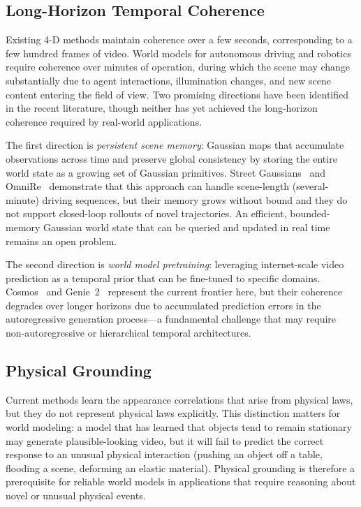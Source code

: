 \subsection{Long-Horizon Temporal Coherence}

Existing 4-D methods maintain coherence over a few seconds, corresponding
to a few hundred frames of video.
World models for autonomous driving and robotics require coherence over minutes
of operation, during which the scene may change substantially due to agent
interactions, illumination changes, and new scene content entering the field of view.
Two promising directions have been identified in the recent literature,
though neither has yet achieved the long-horizon coherence required by
real-world applications.

The first direction is \emph{persistent scene memory}: Gaussian maps that
accumulate observations across time and preserve global consistency by storing
the entire world state as a growing set of Gaussian primitives.
Street Gaussians~\citep{yan2024streetgaussian} and OmniRe~\citep{chen2024omnire}
demonstrate that this approach can handle scene-length (several-minute) driving
sequences, but their memory grows without bound and they do not support
closed-loop rollouts of novel trajectories.
An efficient, bounded-memory Gaussian world state that can be queried and
updated in real time remains an open problem.

The second direction is \emph{world model pretraining}: leveraging internet-scale
video prediction as a temporal prior that can be fine-tuned to specific domains.
Cosmos~\citep{agarwal2025cosmos} and Genie~2~\citep{parkerholder2024genie2}
represent the current frontier here, but their coherence degrades over longer
horizons due to accumulated prediction errors in the autoregressive generation
process---a fundamental challenge that may require non-autoregressive or
hierarchical temporal architectures.

\subsection{Physical Grounding}

Current methods learn the appearance correlations that arise from physical
laws, but they do not represent physical laws explicitly.
This distinction matters for world modeling: a model that has learned that
objects tend to remain stationary may generate plausible-looking video, but
it will fail to predict the correct response to an unusual physical interaction
(pushing an object off a table, flooding a scene, deforming an elastic material).
Physical grounding is therefore a prerequisite for reliable world models in
applications that require reasoning about novel or unusual physical events.

